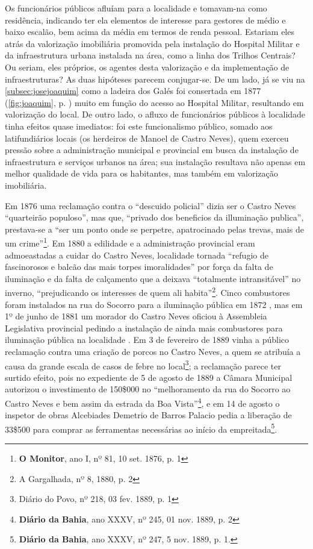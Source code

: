 Os funcionários públicos afluíam para a localidade e tomavam-na como residência, indicando ter ela elementos de interesse para gestores de médio e baixo escalão, bem acima da média em termos de renda pessoal. Estariam eles atrás da valorização imobiliária promovida pela instalação do Hospital Militar e da infraestrutura urbana instalada na área, como a linha dos Trilhos Centrais? Ou seriam, eles próprios, os agentes desta valorização e da implementação de infraestruturas? As duas hipóteses parecem conjugar-se. De um lado, já se viu na \autoref{subsec:josejoaquim} como a ladeira dos Galés foi consertada em 1877 (\autoref{fig:joaquim}, p. \pageref{fig:joaquim}) muito em função do acesso ao Hospital Militar, resultando em valorização do local. De outro lado, o afluxo de funcionários públicos à localidade tinha efeitos quase imediatos: foi este funcionalismo público, somado aos latifundiários locais (os herdeiros de Manoel de Castro Neves), quem exerceu pressão sobre a administração municipal e provincial em busca da instalação de infraestrutura e serviços urbanos na área; sua instalação resultava não apenas em melhor qualidade de vida para os habitantes, mas também em valorização imobiliária. 

Em 1876 uma reclamação contra o ``descuido policial'' dizia ser o Castro Neves ``quarteirão populoso'', mas que, ``privado dos beneficios da illuminação publica'', prestava-se a ``ser um ponto onde se perpetre, apatrocinado pelas trevas, mais de um crime''\footnote{\textbf{O Monitor}, ano I, nº 81, 10 set. 1876, p. 1}. Em 1880 a edilidade e a administração provincial eram admoeastadas a cuidar do Castro Neves, localidade tornada ``refugio de fascinorosos e balcão das mais torpes imoralidades'' por força da falta de iluminação e da falta de calçamento que a deixava ``totalmente intransitável'' no inverno, ``prejudicando os interesses de quem ali habita''\footnote{A Gargalhada, nº 8, 1880, p. 2}. Cinco combustores foram instalados na rua do Socorro para a iluminação pública em 1872 \cite[relat.~obras~públ.,~p.~38]{bahia_1872}, mas em 1º de junho de 1881 um morador do Castro Neves oficiou à Assembleia Legislativa provincial pedindo a instalação de ainda mais combustores para iluminação pública na localidade \cite[p.~3]{bahia_relatassleg_1881}. Em 3 de fevereiro de 1889 vinha a público reclamação contra uma criação de porcos no Castro Neves, a quem se atribuía a causa da grande escala de casos de febre no local\footnote{Diário do Povo, nº 218, 03 fev. 1889, p. 1}; a reclamação parece ter surtido efeito, pois no expediente de 5 de agosto de 1889 a Câmara Municipal autorizou o investimento de 150\$000 no ``melhoramento da rua do Socorro ao Castro Neves e bem assim da estrada da Boa Vista''\footnote{\textbf{Diário da Bahia}, ano XXXV, nº 245, 01 nov. 1889, p. 2}, e em 14 de agosto o inspetor de obras Alcebiades Demetrio de Barros Palacio pedia a liberação de 33\$500 para comprar as ferramentas necessárias ao início da empreitada\footnote{\textbf{Diário da Bahia}, ano XXXV, nº 247, 5 nov. 1889, p. 1.}.

